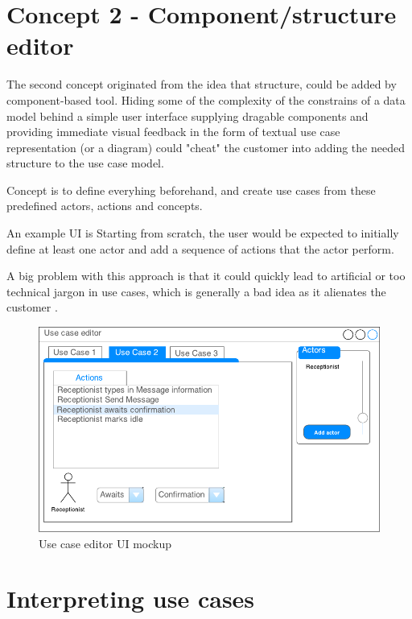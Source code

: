 \section{Concept 2 - Component/structure editor}
The second concept originated from the idea that structure, could be added by component-based tool. Hiding some of the complexity of the constrains of a data model behind a simple user interface supplying dragable components and providing immediate visual feedback in the form of textual use case representation (or a diagram) could "cheat" the customer into adding the needed structure to the use case model.

Concept is to define everyhing beforehand, and create use cases from these predefined actors, actions and concepts.

An example UI is Starting from scratch, the user would be expected to initially define at least one actor and add a sequence of actions that the actor perform.


A big problem with this approach is that it could quickly lead to artificial or too technical jargon in use cases, which is generally a bad idea as it alienates the customer \cite{christel1992}.


\begin{figure}[!htbp]
\includegraphics[scale=0.9]{img/test_case_ui}
\centering
\caption{Use case editor UI mockup}
\label{fig:use_case_editor_mockup}
\end{figure}

\section{Interpreting use cases}

